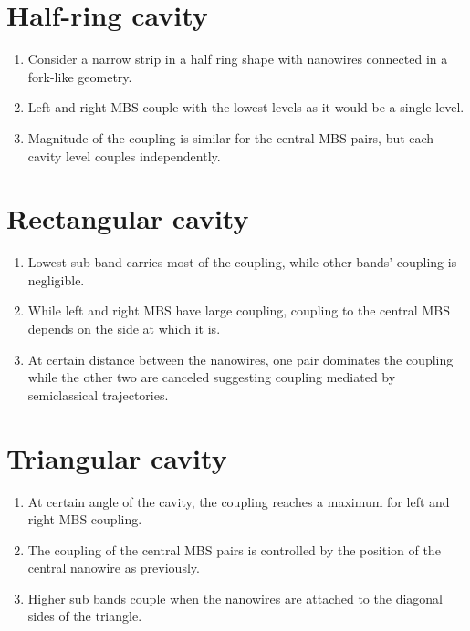 \section{Half-ring cavity}
\begin{enumerate}
\item Consider a narrow strip in a half ring shape with nanowires connected in a fork-like geometry.
\item Left and right MBS couple with the lowest levels as it would be a single level.
\item Magnitude of the coupling is similar for the central MBS pairs, but each cavity level couples independently.
\end{enumerate}

\section{Rectangular cavity}
\begin{enumerate}
\item Lowest sub band carries most of the coupling, while other bands' coupling is negligible.
\item While left and right MBS have large coupling, coupling to the central MBS depends on the side at which it is.
\item At certain distance between the nanowires, one pair dominates the coupling while the other two are canceled suggesting coupling mediated by semiclassical trajectories.
\end{enumerate}

\section{Triangular cavity}
\begin{enumerate}
\item At certain angle of the cavity, the coupling reaches a maximum for left and right MBS coupling.
\item The coupling of the central MBS pairs is controlled by the position of the central nanowire as previously.
\item Higher sub bands couple when the nanowires are attached to the diagonal sides of the triangle.
\end{enumerate}